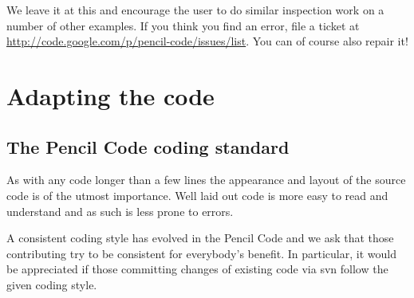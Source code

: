 \documentclass[\mydriver,12pt,twoside,notitlepage,a4paper]{article}
\begin{document}
We leave it at this and encourage the user to do similar
inspection work on a number of other examples.
If you think you find an error, file a ticket at
\url{http://code.google.com/p/pencil-code/issues/list}.
You can of course also repair it!

\section{Adapting the code}

\subsection{The {\sc Pencil Code} coding standard}
\label{ProgrammingStyle}

As with any code longer than a few lines the appearance and layout
of the source code is of the utmost importance.  Well laid out
code is more easy to read and understand and as such is less prone
to errors.

A consistent coding style has evolved in the {\sc Pencil Code} and we
ask that those contributing try to be consistent for everybody's
benefit.  In particular, it would be appreciated if those committing
changes of existing code via svn follow the given coding style.
\end{document}
